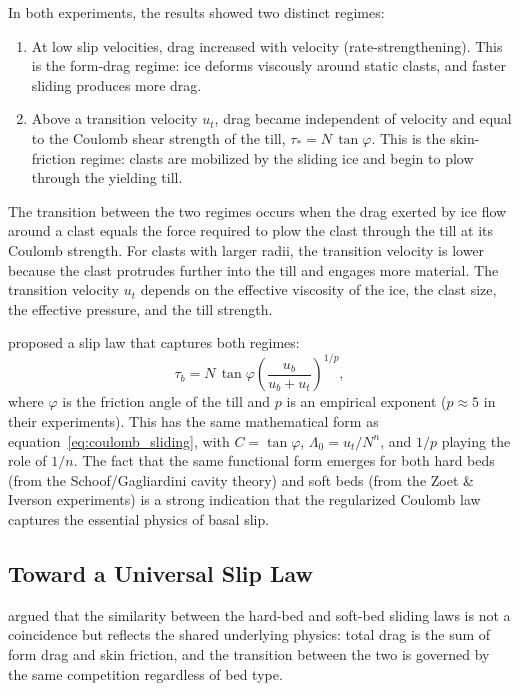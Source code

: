 \documentclass[11pt]{article}
\begin{document}
\medskip
\noindent In both experiments, the results showed two distinct regimes:
\begin{enumerate}
  \item At low slip velocities, drag increased with velocity (rate-strengthening).  This is the form-drag regime: ice deforms viscously around static clasts, and faster sliding produces more drag.
  \item Above a transition velocity $u_t$, drag became independent of velocity and equal to the Coulomb shear strength of the till, $\tau_* = N\,\tan\varphi$.  This is the skin-friction regime: clasts are mobilized by the sliding ice and begin to plow through the yielding till.
\end{enumerate}

\noindent The transition between the two regimes occurs when the drag exerted by ice flow around a clast equals the force required to plow the clast through the till at its Coulomb strength.  For clasts with larger radii, the transition velocity is lower because the clast protrudes further into the till and engages more material.  The transition velocity $u_t$ depends on the effective viscosity of the ice, the clast size, the effective pressure, and the till strength.

\medskip
\noindent \cite{ZoetIverson2020} proposed a slip law that captures both regimes:
\begin{equation}
  \boxed{\tau_b = N\,\tan\varphi\left(\frac{u_b}{u_b + u_t}\right)^{1/p},}
  \label{eq:zoet_iverson}
\end{equation}
where $\varphi$ is the friction angle of the till and $p$ is an empirical exponent ($p \approx 5$ in their experiments).  This has the same mathematical form as equation~\eqref{eq:coulomb_sliding}, with $C = \tan\varphi$, $\Lambda_0 = u_t / N^n$, and $1/p$ playing the role of $1/n$.  The fact that the same functional form emerges for both hard beds (from the Schoof/Gagliardini cavity theory) and soft beds (from the Zoet \& Iverson experiments) is a strong indication that the regularized Coulomb law captures the essential physics of basal slip.

\subsection{Toward a Universal Slip Law}
\label{sec:universal}

\cite{MinchewJoughin2020} argued that the similarity between the hard-bed and soft-bed sliding laws is not a coincidence but reflects the shared underlying physics: total drag is the sum of form drag and skin friction, and the transition between the two is governed by the same competition regardless of bed type.
\end{document}
